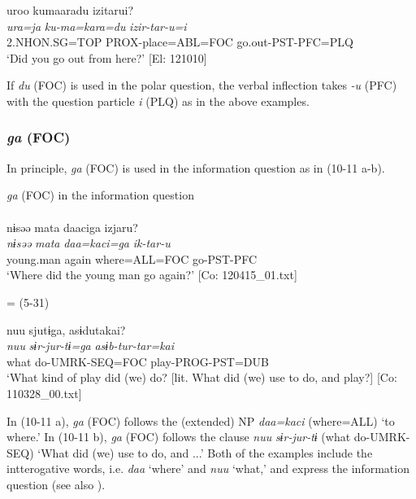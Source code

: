   \ex  %
      \glll    uroo  kumaaradu  izitarui?\\
      \textit{ura=ja}  \textit{ku-ma=kara=du}  \textit{izir-tar-u=i}\\
      2.NHON.SG=TOP  PROX-place=ABL=FOC  go.out-PST-PFC=PLQ\\
      \glt       ‘Did you go out from here?’ [El: 121010]
\z
\z

If \textit{du} (FOC) is used in the polar question, the verbal inflection takes \textit{{}-u} (PFC) with the question particle \textit{i} (PLQ) as in the above examples.

\subsubsection{\textit{ga} (FOC)}\label{sec:10.1.2.2}

In principle, \textit{ga} (FOC) is used in the information question as in (10-11 a-b).

\ea\label{ex:10.11}   \textit{ga} (FOC) in the information question\\
  \ea\relax [= (5-34 a)]\\
      \glll    nɨsəə  mata  daaciga  izjaru?\\
      \textit{nɨsəə}  \textit{mata}  \textit{daa=kaci=ga}  \textit{ik-tar-u}\\
      young.man  again  where=ALL=FOC  go-PST-PFC\\
      \glt       ‘Where did the young man go again?’ [Co: 120415\_01.txt]

  \ex{} = (5-31)

      \glll    nuu  sjutɨga,  asɨdutakai?\\
      \textit{nuu}  \textit{sɨr-jur-tɨ=ga}  \textit{asɨb-tur-tar=kai}\\
      what  do-UMRK-SEQ=FOC  play-PROG-PST=DUB\\
      \glt       ‘What kind of play did (we) do? [lit. What did (we) use to do, and play?] [Co: 110328\_00.txt]
    \z
\z

In (10-11 a), \textit{ga} (FOC) follows the (extended) NP \textit{daa=kaci} (where=ALL) ‘to where.’ In (10-11 b), \textit{ga} (FOC) follows the clause \textit{nuu} \textit{sɨr-jur-tɨ} (what do-UMRK-SEQ) ‘What did (we) use to do, and ...’ Both of the examples include the intterogative words, i.e. \textit{daa} ‘where’ and \textit{nuu} ‘what,’ and express the information question (see also ).

